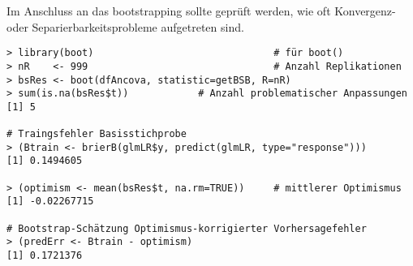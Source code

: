 Im Anschluss an das bootstrapping sollte geprüft werden, wie oft Konvergenz- oder Separierbarkeitsprobleme aufgetreten sind.
\begin{lstlisting}
> library(boot)                               # für boot()
> nR    <- 999                                # Anzahl Replikationen
> bsRes <- boot(dfAncova, statistic=getBSB, R=nR)
> sum(is.na(bsRes$t))            # Anzahl problematischer Anpassungen
[1] 5

# Traingsfehler Basisstichprobe
> (Btrain <- brierB(glmLR$y, predict(glmLR, type="response")))
[1] 0.1494605

> (optimism <- mean(bsRes$t, na.rm=TRUE))     # mittlerer Optimismus
[1] -0.02267715

# Bootstrap-Schätzung Optimismus-korrigierter Vorhersagefehler
> (predErr <- Btrain - optimism)
[1] 0.1721376
\end{lstlisting}
